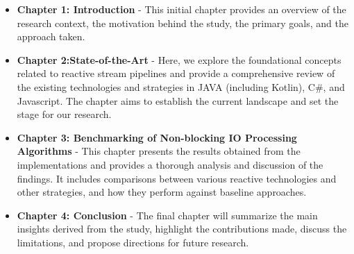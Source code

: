 \begin{itemize}
\item \textbf{Chapter 1: Introduction} - This initial chapter provides an overview of the research context, the motivation behind the study, the primary goals, and the approach taken.

\item \textbf{Chapter 2:State-of-the-Art} - Here, we explore the foundational concepts related to reactive stream pipelines and provide a comprehensive review of the existing technologies and strategies in JAVA (including Kotlin), C\#, and Javascript. The chapter aims to establish the current landscape and set the stage for our research.


\item \textbf{Chapter 3: Benchmarking of Non-blocking IO Processing Algorithms} - This chapter presents the results obtained from the implementations and provides a thorough analysis and discussion of the findings. It includes comparisons between various reactive technologies and other strategies, and how they perform against baseline approaches.

\item \textbf{Chapter 4: Conclusion} - The final chapter will summarize the main insights derived from the study, highlight the contributions made, discuss the limitations, and propose directions for future research.

\end{itemize}

